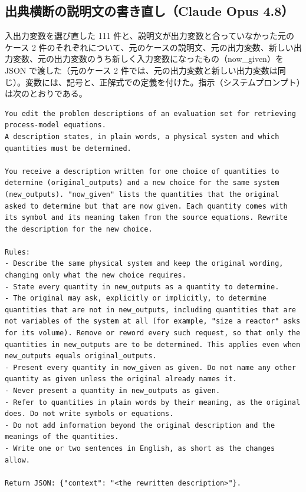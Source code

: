 \documentclass[11pt,a4paper]{ltjsarticle}
\begin{document}
\subsection{出典横断の説明文の書き直し（Claude Opus 4.8）}
入出力変数を選び直した 111 件と、説明文が出力変数と合っていなかった元のケース 2 件のそれぞれについて、元のケースの説明文、元の出力変数、新しい出力変数、元の出力変数のうち新しく入力変数になったもの（now\_given）を JSON で渡した（元のケース 2 件では、元の出力変数と新しい出力変数は同じ）。変数には、記号と、正解式での定義を付けた。指示（システムプロンプト）は次のとおりである。
\begin{Verbatim}[fontsize=\scriptsize, breaklines=true, frame=single]
You edit the problem descriptions of an evaluation set for retrieving process-model equations.
A description states, in plain words, a physical system and which quantities must be determined.

You receive a description written for one choice of quantities to determine (original_outputs) and a new choice for the same system (new_outputs). "now_given" lists the quantities that the original asked to determine but that are now given. Each quantity comes with its symbol and its meaning taken from the source equations. Rewrite the description for the new choice.

Rules:
- Describe the same physical system and keep the original wording, changing only what the new choice requires.
- State every quantity in new_outputs as a quantity to determine.
- The original may ask, explicitly or implicitly, to determine quantities that are not in new_outputs, including quantities that are not variables of the system at all (for example, "size a reactor" asks for its volume). Remove or reword every such request, so that only the quantities in new_outputs are to be determined. This applies even when new_outputs equals original_outputs.
- Present every quantity in now_given as given. Do not name any other quantity as given unless the original already names it.
- Never present a quantity in new_outputs as given.
- Refer to quantities in plain words by their meaning, as the original does. Do not write symbols or equations.
- Do not add information beyond the original description and the meanings of the quantities.
- Write one or two sentences in English, as short as the changes allow.

Return JSON: {"context": "<the rewritten description>"}.
\end{Verbatim}
\end{document}
